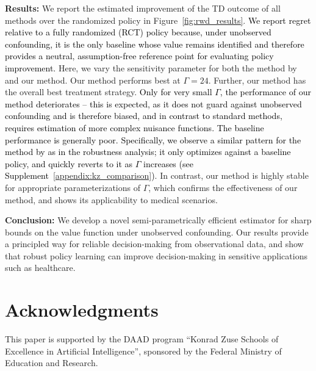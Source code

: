 \documentclass{article} %
\theoremstyle{plain}
\theoremstyle{definition}
\theoremstyle{remark}
\newcommand{\rebuttal}[1]{\textcolor{black}{#1}}
\begin{document}
\textbf{Results:} We report the estimated improvement of the TD outcome of all methods over the randomized policy in Figure~\ref{fig:rwd_results}. \rebuttal{We report regret relative to a fully randomized (RCT) policy because, under unobserved confounding, it is the only baseline whose value remains identified and therefore provides a neutral, assumption-free reference point for evaluating policy improvement.} Here, we vary the sensitivity parameter for both the method by \citet{Kallus.2018c,Kallus.2021d} and our method. Our method performs best at $\Gamma=24$. Further, our method has the overall best treatment strategy. %
\rebuttal{Only for very small $\Gamma$, the performance of our method deteriorates -- this is expected, as it does not guard against unobserved confounding and is therefore biased, and in contrast to standard methods, requires estimation of more complex nuisance functions. The baseline performance is generally poor. Specifically, we observe a similar pattern for the method by \citet{Kallus.2018c,Kallus.2021d} as in the robustness analysis; it only optimizes against a baseline policy, and quickly reverts to it as $\Gamma$ increases (see Supplement~\ref{appendix:kz_comparison})}. In contrast, our method is highly stable for appropriate parameterizations of $\Gamma$, which confirms the effectiveness of our method, and shows its applicability to medical scenarios. 



\textbf{Conclusion:} We develop a novel semi-parametrically efficient estimator for sharp bounds on the value function under unobserved confounding. %
Our results provide a principled way for reliable decision-making from observational data, and show that robust policy learning can improve decision-making in sensitive applications such as healthcare. 





\clearpage

\section*{Acknowledgments}
This paper is supported by the DAAD program ``Konrad Zuse Schools of Excellence in Artificial Intelligence'', sponsored by the Federal Ministry of Education and Research.
\end{document}
